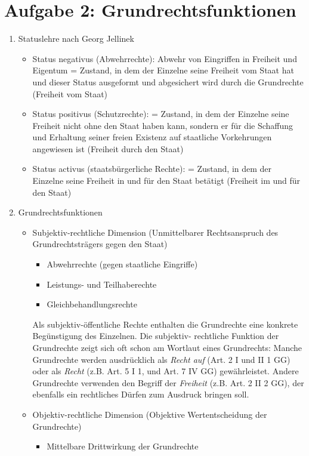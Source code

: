 \documentclass{article}
\begin{document}
	\section*{Aufgabe 2: Grundrechtsfunktionen}
	\begin{enumerate}[label=(\alph*)]
		\item Statuslehre nach Georg Jellinek
		\begin{itemize}
			\item Status negativus (Abwehrrechte): Abwehr von Eingriffen in Freiheit und Eigentum = Zustand, in dem der Einzelne seine Freiheit vom Staat hat und dieser Status ausgeformt und abgesichert wird durch die Grundrechte (Freiheit vom Staat)
			\item Status positivus (Schutzrechte): = Zustand, in dem der Einzelne seine Freiheit nicht ohne den Staat haben kann, sondern er für die Schaffung und Erhaltung seiner freien Existenz auf staatliche Vorkehrungen angewiesen ist (Freiheit durch den Staat)
			\item Status activus (staatsbürgerliche Rechte): = Zustand, in dem der Einzelne seine Freiheit in und für den Staat betätigt (Freiheit im und für den Staat)
		\end{itemize}
		\item Grundrechtsfunktionen
		\begin{itemize}
			\item Subjektiv-rechtliche Dimension (Unmittelbarer Rechtsanspruch des Grundrechtsträgers gegen den Staat)
			\begin{itemize}
				\item Abwehrrechte (gegen staatliche Eingriffe)
				\item Leistungs- und Teilhaberechte
				\item Gleichbehandlungsrechte
			\end{itemize}
			Als subjektiv-öffentliche Rechte enthalten die Grundrechte eine konkrete Begünstigung des Einzelnen. Die subjektiv- rechtliche Funktion der Grundrechte zeigt sich oft schon am Wortlaut eines Grundrechts: Manche Grundrechte werden ausdrücklich als \textit{Recht auf} (Art. 2 I und II 1 GG) oder als \textit{Recht} (z.B. Art. 5 I 1, und Art. 7 IV GG) gewährleistet. Andere Grundrechte verwenden den Begriff der \textit{Freiheit} (z.B. Art. 2 II 2 GG), der ebenfalls ein rechtliches Dürfen zum Ausdruck bringen soll.
			\item Objektiv-rechtliche Dimension (Objektive Wertentscheidung der Grundrechte)
			\begin{itemize}
				\item Mittelbare Drittwirkung der Grundrechte

\end{itemize}
\end{itemize}
\end{enumerate}
\end{document}
